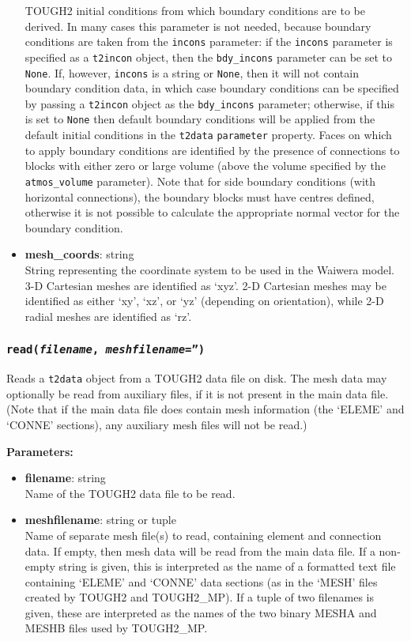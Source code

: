 \begin{itemize}
  TOUGH2 initial conditions from which boundary conditions are to be derived. In many cases this parameter is not needed, because boundary conditions are taken from the \texttt{incons} parameter: if the \texttt{incons} parameter is specified as a \texttt{t2incon} object, then the \texttt{bdy\_incons} parameter can be set to \texttt{None}. If, however, \texttt{incons} is a string or \texttt{None}, then it will not contain boundary condition data, in which case boundary conditions can be specified by passing a \texttt{t2incon} object as the \texttt{bdy\_incons} parameter; otherwise, if this is set to \texttt{None} then default boundary conditions will be applied from the default initial conditions in the \texttt{t2data} \texttt{parameter} property. Faces on which to apply boundary conditions are identified by the presence of connections to blocks with either zero or large volume (above the volume specified by the \texttt{atmos\_volume} parameter). Note that for side boundary conditions (with horizontal connections), the boundary blocks must have centres defined, otherwise it is not possible to calculate the appropriate normal vector for the boundary condition.
\item \textbf{mesh\_coords}: string\\
  String representing the coordinate system to be used in the Waiwera model. 3-D Cartesian meshes are identified as `xyz'. 2-D Cartesian meshes may be identified as either `xy', `xz', or `yz' (depending on orientation), while 2-D radial meshes are identified as `rz'.
\end{itemize}

\begin{snugshade}
\subsubsection{\texttt{read(\emph{filename}, \emph{meshfilename}='')}}
\end{snugshade}
\label{sec:t2data:read}

Reads a \texttt{t2data} object from a TOUGH2 data file on disk.  The mesh data may optionally be read from auxiliary files, if it is not present in the main data file.  (Note that if the main data file does contain mesh information (the `ELEME' and `CONNE' sections), any auxiliary mesh files will not be read.)

\textbf{Parameters:}
\begin{itemize}
\item \textbf{filename}: string\\
  Name of the TOUGH2 data file to be read.
\item \textbf{meshfilename}: string or tuple\\
  Name of separate mesh file(s) to read, containing element and connection data.  If empty, then mesh data will be read from the main data file.  If a non-empty string is given, this is interpreted as the name of a formatted text file containing `ELEME' and `CONNE' data sections (as in the `MESH' files created by TOUGH2 and TOUGH2\_MP). If a tuple of two filenames is given, these are interpreted as the names of the two binary MESHA and MESHB files used by TOUGH2\_MP.
\end{itemize}


